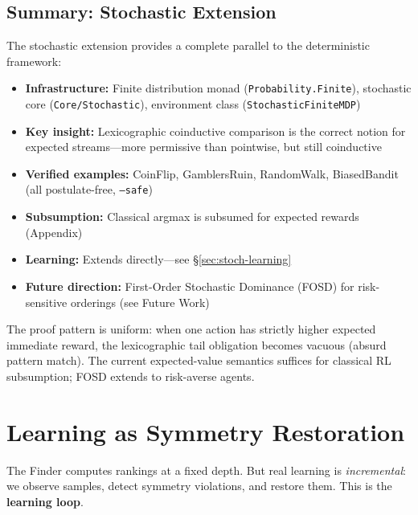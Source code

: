 \documentclass[9pt,a4paper]{article}
\theoremstyle{plain}
\theoremstyle{definition}
\theoremstyle{remark}
\begin{document}
\subsection{Summary: Stochastic Extension}

The stochastic extension provides a complete parallel to the deterministic framework:

\begin{itemize}
\item \textbf{Infrastructure:} Finite distribution monad (\texttt{Probability.Finite}), stochastic core (\texttt{Core/Stochastic}), environment class (\texttt{StochasticFiniteMDP})
\item \textbf{Key insight:} Lexicographic coinductive comparison is the correct notion for expected streams---more permissive than pointwise, but still coinductive
\item \textbf{Verified examples:} CoinFlip, GamblersRuin, RandomWalk, BiasedBandit (all postulate-free, \texttt{--safe})
\item \textbf{Subsumption:} Classical argmax is subsumed for expected rewards (Appendix)
\item \textbf{Learning:} Extends directly---see \S\ref{sec:stoch-learning}
\item \textbf{Future direction:} First-Order Stochastic Dominance (FOSD) for risk-sensitive orderings (see Future Work)
\end{itemize}

\noindent The proof pattern is uniform: when one action has strictly higher expected immediate reward, the lexicographic tail obligation becomes vacuous (absurd pattern match). The current expected-value semantics suffices for classical RL subsumption; FOSD extends to risk-averse agents.


\section{Learning as Symmetry Restoration}

The Finder computes rankings at a fixed depth. But real learning is \emph{incremental}: we observe samples, detect symmetry violations, and restore them. This is the \textbf{learning loop}.
\end{document}

